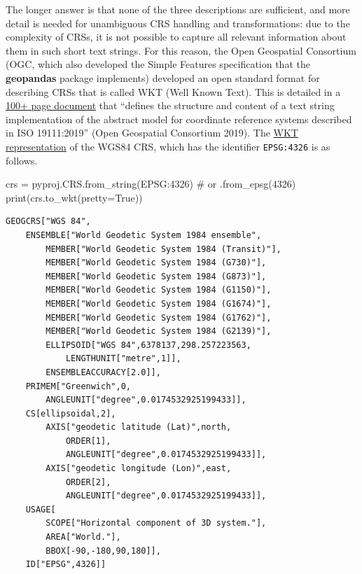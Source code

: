 \documentclass[
  letterpaper,
]{krantz}
\newenvironment{Shaded}{\begin{snugshade}}{\end{snugshade}}
\newcommand{\BuiltInTok}[1]{\textcolor[rgb]{0.00,0.23,0.31}{#1}}
\newcommand{\CommentTok}[1]{\textcolor[rgb]{0.37,0.37,0.37}{#1}}
\newcommand{\NormalTok}[1]{\textcolor[rgb]{0.00,0.23,0.31}{#1}}
\newcommand{\OperatorTok}[1]{\textcolor[rgb]{0.37,0.37,0.37}{#1}}
\newcommand{\StringTok}[1]{\textcolor[rgb]{0.13,0.47,0.30}{#1}}
\newcommand{\VariableTok}[1]{\textcolor[rgb]{0.07,0.07,0.07}{#1}}
\begin{document}
The longer answer is that none of the three descriptions are sufficient,
and more detail is needed for unambiguous CRS handling and
transformations: due to the complexity of CRSs, it is not possible to
capture all relevant information about them in such short text strings.
For this reason, the Open Geospatial Consortium (OGC, which also
developed the Simple Features specification that the \textbf{geopandas}
package implements) developed an open standard format for describing
CRSs that is called WKT (Well Known Text). This is detailed in a
\href{https://portal.opengeospatial.org/files/18-010r7}{100+ page
document} that ``defines the structure and content of a text string
implementation of the abstract model for coordinate reference systems
described in ISO 19111:2019'' (Open Geospatial Consortium 2019). The
\href{https://en.wikipedia.org/wiki/Well-known_text_representation_of_coordinate_reference_systems}{WKT
representation} of the WGS84 CRS, which has the identifier
\texttt{EPSG:4326} is as follows.

\begin{Shaded}
\begin{Highlighting}[]
\NormalTok{crs }\OperatorTok{=}\NormalTok{ pyproj.CRS.from\_string(}\StringTok{\textquotesingle{}EPSG:4326\textquotesingle{}}\NormalTok{) }\CommentTok{\# or \textquotesingle{}.from\_epsg(4326)\textquotesingle{}}
\BuiltInTok{print}\NormalTok{(crs.to\_wkt(pretty}\OperatorTok{=}\VariableTok{True}\NormalTok{))}
\end{Highlighting}
\end{Shaded}

\begin{verbatim}
GEOGCRS["WGS 84",
    ENSEMBLE["World Geodetic System 1984 ensemble",
        MEMBER["World Geodetic System 1984 (Transit)"],
        MEMBER["World Geodetic System 1984 (G730)"],
        MEMBER["World Geodetic System 1984 (G873)"],
        MEMBER["World Geodetic System 1984 (G1150)"],
        MEMBER["World Geodetic System 1984 (G1674)"],
        MEMBER["World Geodetic System 1984 (G1762)"],
        MEMBER["World Geodetic System 1984 (G2139)"],
        ELLIPSOID["WGS 84",6378137,298.257223563,
            LENGTHUNIT["metre",1]],
        ENSEMBLEACCURACY[2.0]],
    PRIMEM["Greenwich",0,
        ANGLEUNIT["degree",0.0174532925199433]],
    CS[ellipsoidal,2],
        AXIS["geodetic latitude (Lat)",north,
            ORDER[1],
            ANGLEUNIT["degree",0.0174532925199433]],
        AXIS["geodetic longitude (Lon)",east,
            ORDER[2],
            ANGLEUNIT["degree",0.0174532925199433]],
    USAGE[
        SCOPE["Horizontal component of 3D system."],
        AREA["World."],
        BBOX[-90,-180,90,180]],
    ID["EPSG",4326]]
\end{verbatim}
\end{document}
